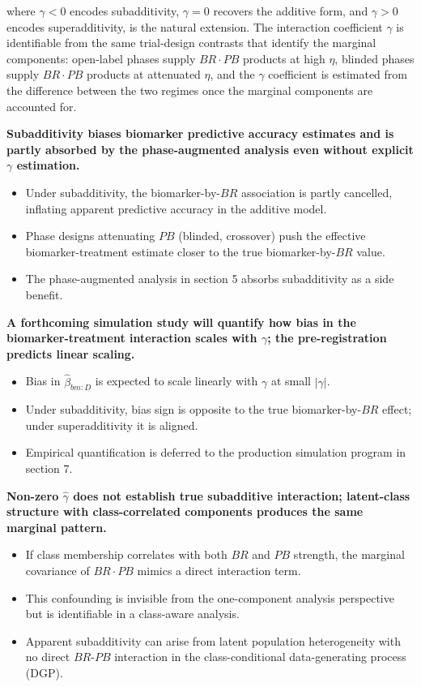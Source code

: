 \documentclass[
  11pt,
]{article}
\begin{document}
where \(\gamma < 0\) encodes subadditivity, \(\gamma = 0\) recovers
the additive form, and \(\gamma > 0\) encodes superadditivity, is
the natural extension. The interaction coefficient \(\gamma\) is
identifiable from the same trial-design contrasts that identify
the marginal components: open-label phases supply \(BR \cdot PB\)
products at high \(\eta\), blinded phases supply \(BR \cdot PB\)
products at attenuated \(\eta\), and the \(\gamma\) coefficient is
estimated from the difference between the two regimes once the
marginal components are accounted for.

\textbf{Subadditivity biases biomarker predictive accuracy estimates and is partly absorbed by the phase-augmented analysis even without explicit $\gamma$ estimation.}

\begin{itemize}\setlength{\itemsep}{2pt}\setlength{\parskip}{0pt}
\item Under subadditivity, the biomarker-by-$BR$ association is partly cancelled, inflating apparent predictive accuracy in the additive model.
\item Phase designs attenuating $PB$ (blinded, crossover) push the effective biomarker-treatment estimate closer to the true biomarker-by-$BR$ value.
\item The phase-augmented analysis in section 5 absorbs subadditivity as a side benefit.
\end{itemize}

\textbf{A forthcoming simulation study will quantify how bias in the biomarker-treatment interaction scales with $\gamma$; the pre-registration predicts linear scaling.}

\begin{itemize}\setlength{\itemsep}{2pt}\setlength{\parskip}{0pt}
\item Bias in $\hat\beta_{bm:D}$ is expected to scale linearly with $\gamma$ at small $|\gamma|$.
\item Under subadditivity, bias sign is opposite to the true biomarker-by-$BR$ effect; under superadditivity it is aligned.
\item Empirical quantification is deferred to the production simulation program in section 7.
\end{itemize}

\textbf{Non-zero $\hat{\gamma}$ does not establish true subadditive interaction; latent-class structure with class-correlated components produces the same marginal pattern.}

\begin{itemize}\setlength{\itemsep}{2pt}\setlength{\parskip}{0pt}
\item If class membership correlates with both $BR$ and $PB$ strength, the marginal covariance of $BR \cdot PB$ mimics a direct interaction term.
\item This confounding is invisible from the one-component analysis perspective but is identifiable in a class-aware analysis.
\item Apparent subadditivity can arise from latent population heterogeneity with no direct $BR$-$PB$ interaction in the class-conditional data-generating process (DGP).
\end{itemize}
\end{document}
